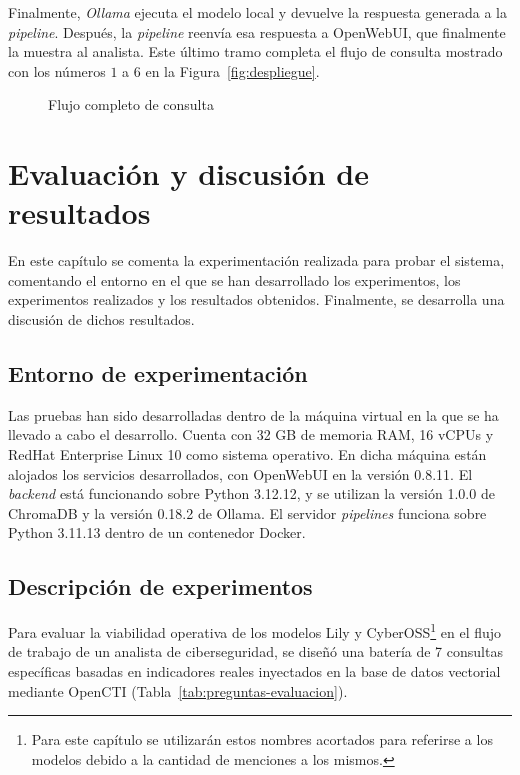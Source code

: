 \documentclass[12pt]{report}
\begin{document}
Finalmente, \textit{Ollama} ejecuta el modelo local y devuelve la respuesta generada a la \textit{pipeline}. Después, la \textit{pipeline} reenvía esa respuesta a OpenWebUI, que finalmente la muestra al analista. Este último tramo completa el flujo de consulta mostrado con los números $1$ a $6$ en la Figura~\ref{fig:despliegue}.
 
\begin{figure}[] 
	\centering
	
	\caption{Flujo completo de consulta}
	\label{fig:secuencia}
\end{figure}

\newpage
\chapter{Evaluación y discusión de resultados}
\label{chap:evaluacion}
En este capítulo se comenta la experimentación realizada para probar el sistema, comentando el entorno en el que se han desarrollado los experimentos, los experimentos realizados y los resultados obtenidos. Finalmente, se desarrolla una discusión de dichos resultados.

\section{Entorno de experimentación}
Las pruebas han sido desarrolladas dentro de la máquina virtual en la que se ha llevado a cabo el desarrollo. Cuenta con 32 GB de memoria RAM, 16 vCPUs y RedHat Enterprise Linux 10 como sistema operativo.  En dicha máquina están alojados los servicios desarrollados, con OpenWebUI en la versión 0.8.11. El \textit{backend} está funcionando sobre Python 3.12.12, y se utilizan la versión 1.0.0 de ChromaDB y la versión 0.18.2 de Ollama. El servidor \textit{pipelines} funciona sobre Python 3.11.13 dentro de un contenedor Docker.

\section{Descripción de experimentos}
Para evaluar la viabilidad operativa de los modelos Lily y CyberOSS\footnote{Para este capítulo se utilizarán estos nombres acortados para referirse a los modelos debido a la cantidad de menciones a los mismos.} en el flujo de trabajo de un analista de ciberseguridad, se diseñó una batería de 7 consultas específicas basadas en indicadores reales inyectados en la base de datos vectorial mediante OpenCTI (Tabla~\ref{tab:preguntas-evaluacion}).
\end{document}
